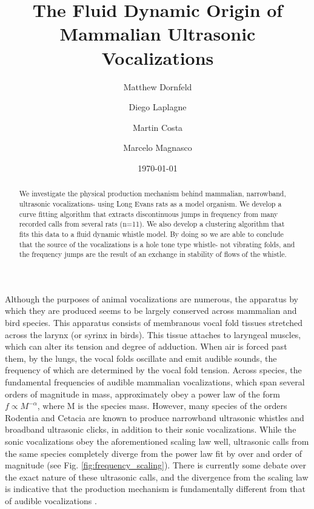 \documentclass[twocolumn, prl]{revtex4}
\begin{document}
\title{The Fluid Dynamic Origin of Mammalian Ultrasonic Vocalizations}

\author{Matthew Dornfeld}

\author{Diego Laplagne}

\author{Martin Costa} 

\author{Marcelo Magnasco}
\date{\today}
\begin{abstract}
We investigate the physical production mechanism behind mammalian, narrowband, ultrasonic vocalizations- using Long Evans rats as a model organism. We develop a curve fitting algorithm that extracts discontinuous jumps in frequency from many recorded calls from several rats (n=11). We also develop a clustering algorithm that fits this data to a fluid dynamic whistle model. By doing so we are able to conclude that the source of the vocalizations is a hole tone type whistle- not vibrating folds, and the frequency jumps are the result of an exchange in stability of flows of the whistle.
\end{abstract}
\maketitle
Although the purposes of animal vocalizations are numerous, the apparatus by which they are produced seems to be largely conserved across mammalian and bird species. This apparatus consists of membranous vocal fold tissues stretched across the larynx (or syrinx in birds). This tissue attaches to laryngeal muscles, which can alter its tension and degree of adduction. When air is forced past them, by the lungs, the vocal folds oscillate and emit audible sounds, the frequency of which are determined by the vocal fold tension. Across species, the fundamental frequencies of audible mammalian vocalizations, which span several orders of magnitude in mass, approximately obey a power law of the form $f\propto M^{-\alpha}$, where M is the species mass. However, many species of the orders Rodentia and Cetacia are known to produce narrowband ultrasonic whistles and broadband ultrasonic clicks, in addition to their sonic vocalizations. While the sonic vocalizations obey the aforementioned scaling law well, ultrasonic calls from the same species completely diverge from the power law fit by over and order of magnitude (see Fig. \ref{fig:frequency_scaling}). There is currently some debate over the exact nature of these ultrasonic calls, and the divergence from the scaling law is indicative that the production mechanism is fundamentally different from that of audible vocalizations \cite{Fletcher2010, Berke2010}.
\end{document}
